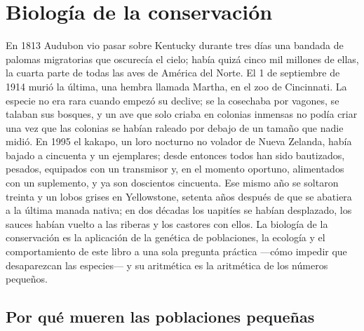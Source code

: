 \chapter{Biología de la conservación}\label{ch:b3:conservation-biology}

En 1813 Audubon vio pasar sobre Kentucky durante tres días una bandada
de palomas migratorias que oscurecía el cielo; había quizá cinco mil
millones de ellas, la cuarta parte de todas las aves de América del
Norte. El 1 de septiembre de 1914 murió la última, una hembra llamada
Martha, en el zoo de Cincinnati. La especie no era rara cuando empezó
su declive; se la cosechaba por vagones, se talaban sus bosques, y un
ave que solo criaba en colonias inmensas no podía criar una vez que las
colonias se habían raleado por debajo de un tamaño que nadie midió. En
1995 el kakapo, un loro nocturno no volador de Nueva Zelanda, había
bajado a cincuenta y un ejemplares; desde entonces todos han sido
bautizados, pesados, equipados con un transmisor y, en el momento
oportuno, alimentados con un suplemento, y ya son doscientos cincuenta.
Ese mismo año se soltaron treinta y un lobos grises en Yellowstone,
setenta años después de que se abatiera a la última manada nativa; en
dos décadas los uapitíes se habían desplazado, los sauces habían vuelto
a las riberas y los castores con ellos. La biología de la conservación
es la aplicación de la genética de poblaciones, la ecología y el
comportamiento de este libro a una sola pregunta práctica ---cómo
impedir que desaparezcan las especies--- y su aritmética es la
aritmética de los números pequeños.

\section{Por qué mueren las poblaciones pequeñas}

